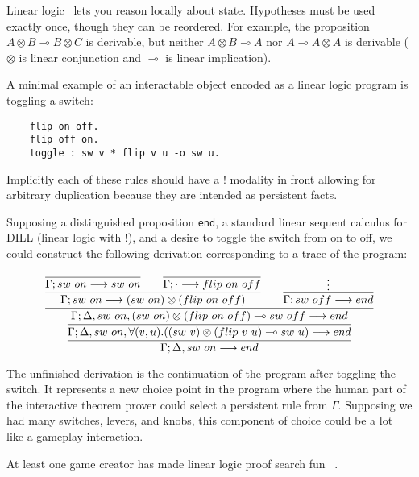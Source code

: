 \newcommand{\lolli}{\multimap}

Linear logic~\cite{Girard87} lets you reason locally about state. Hypotheses must be used
exactly once, though they can be reordered. For example, the proposition $A
\otimes B \lolli B \otimes C$ is derivable, but neither $A \otimes B \lolli
A$ nor $A \lolli A \otimes A$ is derivable ($\otimes$ is linear
conjunction and $\lolli$ is linear implication).

A minimal example of an interactable object encoded as a linear logic
program is toggling a switch:

\begin{verbatim}
    flip on off.
    flip off on.
    toggle : sw v * flip v u -o sw u.
\end{verbatim}

Implicitly each of these rules should have a $!$ modality in front allowing
for arbitrary duplication because they are intended as persistent facts.

Supposing a distinguished proposition \verb|end|, a standard linear sequent
calculus for DILL (linear logic with $!$), and a desire to toggle the
switch from on to off, we could construct the following derivation
corresponding to a trace of the program:

{\small
\[
\infer
{
  \Gamma; \Delta, sw\ on \longrightarrow end
}
{
  \infer
  {
    \Gamma; \Delta, sw\ on, \forall(v,u).((sw\ v)\otimes (flip\ v\
    u)\multimap sw\ u)
    \longrightarrow end
  }
  {
  \infer
    {
    \Gamma; \Delta, sw\ on, (sw\ on)\otimes (flip\ on\ off)\multimap sw\
    off
    \longrightarrow end
    }
    {
        \infer{
          \Gamma; sw\ on \longrightarrow (sw\ on)\otimes(flip\ on\ off)
          }
          {
            \infer
            {\Gamma; sw\ on \longrightarrow sw\ on}
            {}
            \qquad
            \infer
            {\Gamma; \cdot \longrightarrow flip\ on\ off}
            {}
          }
        \qquad
        \infer{
          \Gamma; sw\ off \longrightarrow end
          }
          {\vdots
          }
    }
  }
}
\]
}

The unfinished derivation is the continuation of the program after toggling
the switch. It represents a new choice point in the program where the human
part of the interactive theorem prover could select a persistent rule from
$\Gamma$.  Supposing we had many switches, levers, and knobs, this
component of choice could be a lot like a gameplay interaction.

At least one game creator has made linear logic proof search fun
~\cite{theatrics}.
% 
% 
